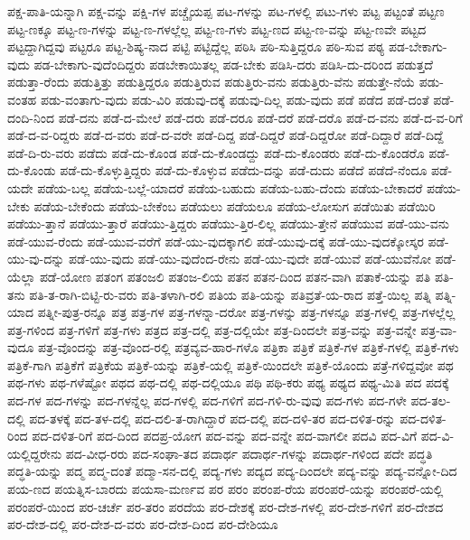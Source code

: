 {ಪಕ್ಷ-ಪಾತಿ-ಯನ್ನಾಗಿ
ಪಕ್ಷ-ವನ್ನು
ಪಕ್ಷಿ-ಗಳ
ಪಚ್ಚೈಯಪ್ಪ
ಪಟ-ಗಳನ್ನು
ಪಟ-ಗಳಲ್ಲಿ
ಪಟು-ಗಳು
ಪಟ್ಟ
ಪಟ್ಟಂತೆ
ಪಟ್ಟಣ
ಪಟ್ಟ-ಣಕ್ಕೂ
ಪಟ್ಟ-ಣ-ಗಳನ್ನು
ಪಟ್ಟ-ಣ-ಗಳಲ್ಲೆಲ್ಲ
ಪಟ್ಟ-ಣ-ಗಳು
ಪಟ್ಟ-ಣದ
ಪಟ್ಟ-ಣ-ವನ್ನು
ಪಟ್ಟ-ಣವೇ
ಪಟ್ಟದ
ಪಟ್ಟದ್ದಾಗಿದ್ದವು
ಪಟ್ಟರೂ
ಪಟ್ಟ-ಶಿಷ್ಯ-ನಾದ
ಪಟ್ಟಿ
ಪಟ್ಟಿದ್ದೆಲ್ಲ
ಪಠಿಸಿ
ಪಠಿ-ಸುತ್ತಿದ್ದರೂ
ಪಠಿ-ಸುವ
ಪಠ್ಯ
ಪಡ-ಬೇಕಾಗು-ವುದು
ಪಡ-ಬೇಕಾಗು-ವುದೆಂದಿದ್ದರು
ಪಡಬೇಕಾಯಿತಲ್ಲ
ಪಡ-ಬೇಕು
ಪಡಿಸಿ-ದರು
ಪಡಿಸಿ-ದು-ದರಿಂದ
ಪಡುತ್ತದೆ
ಪಡುತ್ತಾ-ರೆಂದು
ಪಡುತ್ತಿತ್ತು
ಪಡುತ್ತಿದ್ದರೂ
ಪಡುತ್ತಿರುವ
ಪಡುತ್ತಿರು-ವನು
ಪಡುತ್ತಿರು-ವೆನು
ಪಡುತ್ತೇ-ನೆಯೆ
ಪಡು-ವಂತಹ
ಪಡು-ವಂತಾಗು-ವುದು
ಪಡು-ವಿರಿ
ಪಡುವು-ದಕ್ಕೆ
ಪಡುವು-ದಿಲ್ಲ
ಪಡು-ವುದು
ಪಡೆ
ಪಡೆದ
ಪಡೆ-ದಂತೆ
ಪಡೆ-ದಂದಿ-ನಿಂದ
ಪಡೆ-ದನು
ಪಡೆ-ದ-ಮೇಲೆ
ಪಡೆ-ದರು
ಪಡೆ-ದರೂ
ಪಡೆ-ದರೆ
ಪಡೆ-ದರೊ
ಪಡೆ-ದ-ವನು
ಪಡೆ-ದ-ವ-ರಿಗೆ
ಪಡೆ-ದ-ವ-ರಿದ್ದರು
ಪಡೆ-ದ-ವರು
ಪಡೆ-ದ-ವರೇ
ಪಡೆ-ದಿದ್ದ
ಪಡೆ-ದಿದ್ದರೆ
ಪಡೆ-ದಿದ್ದರೋ
ಪಡೆ-ದಿದ್ದಾರೆ
ಪಡೆ-ದಿದ್ದೆ
ಪಡೆ-ದಿ-ರು-ವರು
ಪಡೆದು
ಪಡೆ-ದು-ಕೊಂಡ
ಪಡೆ-ದು-ಕೊಂಡದ್ದು
ಪಡೆ-ದು-ಕೊಂಡರು
ಪಡೆ-ದು-ಕೊಂಡರೊ
ಪಡೆ-ದು-ಕೊಂಡು
ಪಡೆ-ದು-ಕೊಳ್ಳುತ್ತಿದ್ದರು
ಪಡೆ-ದು-ಕೊಳ್ಳುವ
ಪಡೆದು-ದನ್ನು
ಪಡೆ-ದುದು
ಪಡೆದೆ
ಪಡೆದೆ-ನೆಂದೂ
ಪಡೆ-ಯದೇ
ಪಡೆಯ-ಬಲ್ಲ
ಪಡೆಯ-ಬಲ್ಲೆ-ಯಾದರೆ
ಪಡೆಯ-ಬಹುದು
ಪಡೆಯ-ಬಹು-ದೆಂದು
ಪಡೆಯ-ಬೇಕಾದರೆ
ಪಡೆಯ-ಬೇಕು
ಪಡೆಯ-ಬೇಕೆಂದು
ಪಡೆಯ-ಬೇಕೆಂಬ
ಪಡೆಯಲು
ಪಡೆಯಲೂ
ಪಡೆಯ-ಲೋಸುಗ
ಪಡೆಯಿತು
ಪಡೆಯಿರಿ
ಪಡೆಯು-ತ್ತಾನೆ
ಪಡೆಯು-ತ್ತಾರೆ
ಪಡೆಯು-ತ್ತಿದ್ದರು
ಪಡೆಯು-ತ್ತಿರ-ಲಿಲ್ಲ
ಪಡೆಯು-ತ್ತೇನೆ
ಪಡೆಯುವ
ಪಡೆ-ಯು-ವನು
ಪಡೆ-ಯುವ-ರೆಂದು
ಪಡೆ-ಯುವ-ವರೆಗೆ
ಪಡೆ-ಯು-ವುದಕ್ಕಾಗಲಿ
ಪಡೆ-ಯುವು-ದಕ್ಕೆ
ಪಡೆ-ಯು-ವುದಕ್ಕೋಸ್ಕರ
ಪಡೆ-ಯು-ವು-ದನ್ನು
ಪಡೆ-ಯು-ವುದು
ಪಡೆ-ಯು-ವುದೆಂದ-ರೇನು
ಪಡೆ-ಯು-ವುದೇ
ಪಡೆ-ಯುವೆ
ಪಡೆ-ಯುವೆನೋ
ಪಡೆ-ಯೆಲ್ಲಾ
ಪಡೆ-ಯೋಣ
ಪತಂಗ
ಪತಂಜಲಿ
ಪತಂಜ-ಲಿಯ
ಪತನ
ಪತನ-ದಿಂದ
ಪತನ-ವಾಗಿ
ಪತಾಕೆ-ಯನ್ನು
ಪತಿ
ಪತಿ-ತನು
ಪತಿ-ತ-ರಾಗಿ-ಬಿಟ್ಟಿ-ರು-ವರು
ಪತಿ-ತಳಾಗಿ-ರಲಿ
ಪತಿಯ
ಪತಿ-ಯನ್ನು
ಪತಿವ್ರತೆ-ಯ-ರಾದ
ಪತ್ತೆ-ಯಿಲ್ಲ
ಪತ್ನಿ
ಪತ್ನಿ-ಯಾದ
ಪತ್ನೀ-ಪುತ್ರ-ರನ್ನೂ
ಪತ್ರ
ಪತ್ರ-ಗಳ
ಪತ್ರ-ಗಳನ್ನಾ-ದರೋ
ಪತ್ರ-ಗಳನ್ನು
ಪತ್ರ-ಗಳನ್ನೂ
ಪತ್ರ-ಗಳಲ್ಲಿ
ಪತ್ರ-ಗಳಲ್ಲೆಲ್ಲ
ಪತ್ರ-ಗಳಿಂದ
ಪತ್ರ-ಗಳಿಗೆ
ಪತ್ರ-ಗಳು
ಪತ್ರದ
ಪತ್ರ-ದಲ್ಲಿ
ಪತ್ರ-ದಲ್ಲಿಯೇ
ಪತ್ರ-ದಿಂದಲೇ
ಪತ್ರ-ವನ್ನು
ಪತ್ರ-ವನ್ನೇ
ಪತ್ರ-ವಾ-ವುದೂ
ಪತ್ರ-ವೊಂದನ್ನು
ಪತ್ರ-ವೊಂದ-ರಲ್ಲಿ
ಪತ್ರವ್ಯವ-ಹಾರ-ಗಳೊ
ಪತ್ರಿಕಾ
ಪತ್ರಿಕೆ
ಪತ್ರಿಕೆ-ಗಳ
ಪತ್ರಿಕೆ-ಗಳಲ್ಲಿ
ಪತ್ರಿಕೆ-ಗಳು
ಪತ್ರಿಕೆ-ಗಾಗಿ
ಪತ್ರಿಕೆಗೆ
ಪತ್ರಿಕೆಯ
ಪತ್ರಿಕೆ-ಯನ್ನು
ಪತ್ರಿಕೆ-ಯಲ್ಲಿ
ಪತ್ರಿಕೆ-ಯಿಂದಲೇ
ಪತ್ರಿಕೆ-ಯೊಂದು
ಪತ್ರೆ-ಗಳಿದ್ದವೋ
ಪಥ
ಪಥ-ಗಳು
ಪಥ-ಗಳೆಷ್ಟೋ
ಪಥದ
ಪಥ-ದಲ್ಲಿ
ಪಥ-ದಲ್ಲಿಯೂ
ಪಥಿ
ಪಥಿ-ಕರು
ಪಥ್ಯ
ಪಥ್ಯದ
ಪಥ್ಯ-ಮಿತಿ
ಪದ
ಪದಕ್ಕೆ
ಪದ-ಗಳ
ಪದ-ಗಳನ್ನು
ಪದ-ಗಳನ್ನೆಲ್ಲ
ಪದ-ಗಳಲ್ಲಿ
ಪದ-ಗಳಿಗೆ
ಪದ-ಗಳಿ-ರು-ವುವು
ಪದ-ಗಳು
ಪದ-ಗಳೇ
ಪದ-ತಲ-ದಲ್ಲಿ
ಪದ-ತಳಕ್ಕೆ
ಪದ-ತಳ-ದಲ್ಲಿ
ಪದ-ದಲಿ-ತ-ರಾಗಿದ್ದಾರೆ
ಪದ-ದಲ್ಲಿ
ಪದ-ದಳಿ-ತರ
ಪದ-ದಳಿತ-ರನ್ನು
ಪದ-ದಳಿತ-ರಿಂದ
ಪದ-ದಳಿತ-ರಿಗೆ
ಪದ-ದಿಂದ
ಪದಪ್ರ-ಯೋಗ
ಪದ-ವನ್ನು
ಪದ-ವನ್ನೇ
ಪದ-ವಾಗಲೀ
ಪದವಿ
ಪದ-ವಿಗೆ
ಪದ-ವಿ-ಯಲ್ಲಿದ್ದರೇನು
ಪದ-ವೀಧ-ರರು
ಪದ-ಸಂಘಾ-ತದ
ಪದಾರ್ಥ
ಪದಾರ್ಥ-ಗಳನ್ನು
ಪದಾರ್ಥ-ಗಳಿಂದ
ಪದೇ
ಪದ್ಧತಿ
ಪದ್ಧತಿ-ಯನ್ನು
ಪದ್ಮ
ಪದ್ಮ-ದಂತೆ
ಪದ್ಮಾ-ಸನ-ದಲ್ಲಿ
ಪದ್ಯ-ಗಳು
ಪದ್ಯದ
ಪದ್ಯ-ದಿಂದಲೇ
ಪದ್ಯ-ವನ್ನು
ಪದ್ಯ-ವನ್ನೋ-ದಿದ
ಪಯ-ಣದ
ಪಯತ್ನಿಸ-ಬಾರದು
ಪಯಸಾ-ಮರ್ಣವ
ಪರ
ಪರಂ
ಪರಂಪ-ರೆಯ
ಪರಂಪರೆ-ಯನ್ನು
ಪರಂಪರೆ-ಯಲ್ಲಿ
ಪರಂಪರೆ-ಯಿಂದ
ಪರ-ಚರ್ಚೆ
ಪರ-ತರಂ
ಪರದೆಯ
ಪರ-ದೇಶಕ್ಕೆ
ಪರ-ದೇಶ-ಗಳಲ್ಲಿ
ಪರ-ದೇಶ-ಗಳಿಗೆ
ಪರ-ದೇಶದ
ಪರ-ದೇಶ-ದಲ್ಲಿ
ಪರ-ದೇಶ-ದ-ವರು
ಪರ-ದೇಶ-ದಿಂದ
ಪರ-ದೇಶಿಯೂ
}
